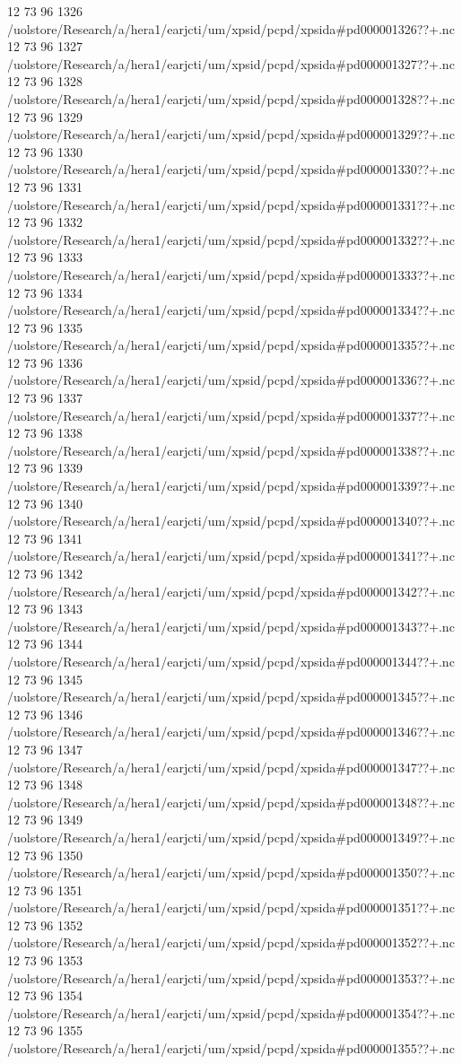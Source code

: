 12 73 96
1326
/uolstore/Research/a/hera1/earjcti/um/xpsid/pcpd/xpsida#pd000001326??+.nc
12 73 96
1327
/uolstore/Research/a/hera1/earjcti/um/xpsid/pcpd/xpsida#pd000001327??+.nc
12 73 96
1328
/uolstore/Research/a/hera1/earjcti/um/xpsid/pcpd/xpsida#pd000001328??+.nc
12 73 96
1329
/uolstore/Research/a/hera1/earjcti/um/xpsid/pcpd/xpsida#pd000001329??+.nc
12 73 96
1330
/uolstore/Research/a/hera1/earjcti/um/xpsid/pcpd/xpsida#pd000001330??+.nc
12 73 96
1331
/uolstore/Research/a/hera1/earjcti/um/xpsid/pcpd/xpsida#pd000001331??+.nc
12 73 96
1332
/uolstore/Research/a/hera1/earjcti/um/xpsid/pcpd/xpsida#pd000001332??+.nc
12 73 96
1333
/uolstore/Research/a/hera1/earjcti/um/xpsid/pcpd/xpsida#pd000001333??+.nc
12 73 96
1334
/uolstore/Research/a/hera1/earjcti/um/xpsid/pcpd/xpsida#pd000001334??+.nc
12 73 96
1335
/uolstore/Research/a/hera1/earjcti/um/xpsid/pcpd/xpsida#pd000001335??+.nc
12 73 96
1336
/uolstore/Research/a/hera1/earjcti/um/xpsid/pcpd/xpsida#pd000001336??+.nc
12 73 96
1337
/uolstore/Research/a/hera1/earjcti/um/xpsid/pcpd/xpsida#pd000001337??+.nc
12 73 96
1338
/uolstore/Research/a/hera1/earjcti/um/xpsid/pcpd/xpsida#pd000001338??+.nc
12 73 96
1339
/uolstore/Research/a/hera1/earjcti/um/xpsid/pcpd/xpsida#pd000001339??+.nc
12 73 96
1340
/uolstore/Research/a/hera1/earjcti/um/xpsid/pcpd/xpsida#pd000001340??+.nc
12 73 96
1341
/uolstore/Research/a/hera1/earjcti/um/xpsid/pcpd/xpsida#pd000001341??+.nc
12 73 96
1342
/uolstore/Research/a/hera1/earjcti/um/xpsid/pcpd/xpsida#pd000001342??+.nc
12 73 96
1343
/uolstore/Research/a/hera1/earjcti/um/xpsid/pcpd/xpsida#pd000001343??+.nc
12 73 96
1344
/uolstore/Research/a/hera1/earjcti/um/xpsid/pcpd/xpsida#pd000001344??+.nc
12 73 96
1345
/uolstore/Research/a/hera1/earjcti/um/xpsid/pcpd/xpsida#pd000001345??+.nc
12 73 96
1346
/uolstore/Research/a/hera1/earjcti/um/xpsid/pcpd/xpsida#pd000001346??+.nc
12 73 96
1347
/uolstore/Research/a/hera1/earjcti/um/xpsid/pcpd/xpsida#pd000001347??+.nc
12 73 96
1348
/uolstore/Research/a/hera1/earjcti/um/xpsid/pcpd/xpsida#pd000001348??+.nc
12 73 96
1349
/uolstore/Research/a/hera1/earjcti/um/xpsid/pcpd/xpsida#pd000001349??+.nc
12 73 96
1350
/uolstore/Research/a/hera1/earjcti/um/xpsid/pcpd/xpsida#pd000001350??+.nc
12 73 96
1351
/uolstore/Research/a/hera1/earjcti/um/xpsid/pcpd/xpsida#pd000001351??+.nc
12 73 96
1352
/uolstore/Research/a/hera1/earjcti/um/xpsid/pcpd/xpsida#pd000001352??+.nc
12 73 96
1353
/uolstore/Research/a/hera1/earjcti/um/xpsid/pcpd/xpsida#pd000001353??+.nc
12 73 96
1354
/uolstore/Research/a/hera1/earjcti/um/xpsid/pcpd/xpsida#pd000001354??+.nc
12 73 96
1355
/uolstore/Research/a/hera1/earjcti/um/xpsid/pcpd/xpsida#pd000001355??+.nc
